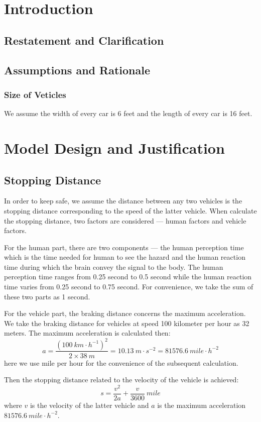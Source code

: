 \documentclass[a4paper,12pt]{article}
\begin{document}
	\section{Introduction}
	\subsection{Restatement and Clarification}
	\subsection{Assumptions and Rationale}
	\subsubsection{Size of Veticles}
	We assume the width of every car is 6 feet and the length of every car is 16 feet.
	\section{Model Design and Justification}
	\subsection{Stopping Distance}
	In order to keep safe, we assume the distance between any two vehicles is the stopping distance corresponding to the speed of the latter vehicle. When calculate the stopping distance, two factors are considered — human factors and vehicle factors.


	For the human part, there are two components — the human perception time which is the time needed for human to see the hazard and the human reaction time during which the brain convey the signal to the body. The human perception time ranges from 0.25 second to 0.5 second while the human reaction time varies from 0.25 second to 0.75 second.\cite{stopping} For convenience, we take the sum of these two parts as 1 second.

	For the vehicle part, the braking distance concerns the maximum acceleration. We take the braking distance for vehicles at speed 100 kilometer per hour as 32 meters. The maximum acceleration is calculated then:
	$$ a=\dfrac{(100\ km\cdot h^{-1})^2}{2\times 38\ m}=10.13\ m\cdot s^{-2}=81576.6\ mile\cdot h^{-2} $$
	here we use mile per hour for the convenience of the subsequent calculation.

	Then the stopping distance related to the velocity of the vehicle is achieved:
	$$ s=\dfrac{v^2}{2a}+\dfrac{v}{3600}\ mile $$
	where $ v $ is the velocity of the latter vehicle and $ a $ is the maximum acceleration $ 81576.6\ mile\cdot h^{-2} $.
\end{document}
